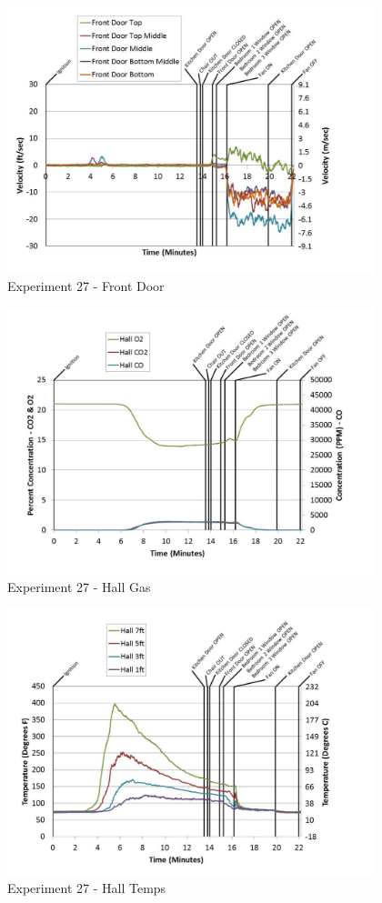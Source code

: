 \documentclass{article}
\begin{document}
\begin{appendices}
	\clearpage

	\begin{figure}[h!]
		\centering
		\includegraphics[height=3.05in]{0_Images/Results_Charts/Exp_27_Charts/FrontDoor.pdf}
		\caption{Experiment 27 - Front Door}
	\end{figure}
 

	\begin{figure}[h!]
		\centering
		\includegraphics[height=3.05in]{0_Images/Results_Charts/Exp_27_Charts/HallGas.pdf}
		\caption{Experiment 27 - Hall Gas}
	\end{figure}
 
	\clearpage

	\begin{figure}[h!]
		\centering
		\includegraphics[height=3.05in]{0_Images/Results_Charts/Exp_27_Charts/HallTemps.pdf}
		\caption{Experiment 27 - Hall Temps}
	\end{figure}
 


\end{appendices}
\end{document}
